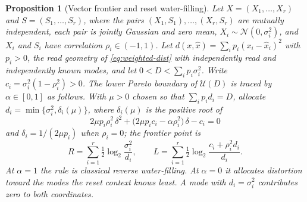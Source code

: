 \documentclass[letterpaper,onecolumn]{IEEEtran}
\newtheorem{proposition}{Proposition}
\theoremstyle{definition}
\theoremstyle{remark}
\newcommand{\1}{\mathbf{1}}
\begin{document}
\begin{proposition}[Vector frontier and reset water-filling]\label{prop:vector-frontier}
Let $X=(X_1,\ldots,X_r)$ and $S=(S_1,\ldots,S_r)$, where the pairs
$(X_1,S_1),\ldots,(X_r,S_r)$ are mutually independent, each pair is jointly
Gaussian and zero mean, $X_i\sim\mathcal N(0,\sigma_i^2)$, and $X_i$ and $S_i$
have correlation $\rho_i\in(-1,1)$. Let
$d(x,\hat x)=\sum_i p_i(x_i-\hat x_i)^2$ with $p_i>0$, the read geometry of
\eqref{eq:weighted-dist} with independently read and independently known
modes, and let $0<D<\sum_ip_i\sigma_i^2$. Write $c_i=\sigma_i^2(1-\rho_i^2)>0$.
The lower Pareto boundary of $\mathcal U(D)$ is traced by $\alpha\in[0,1]$ as
follows. With $\mu>0$ chosen so
that $\sum_i p_id_i=D$, allocate $d_i=\min\{\sigma_i^2,\delta_i(\mu)\}$,
where $\delta_i(\mu)$ is the positive root of
\begin{equation}
 2\mu p_i\rho_i^2\,\delta^2
 +\bigl(2\mu p_ic_i-\alpha\rho_i^2\bigr)\,\delta
 -c_i=0
 \label{eq:alloc-quadratic}
\end{equation}
and $\delta_i=1/(2\mu p_i)$ when $\rho_i=0$; the frontier point is
\begin{equation}
 R=\sum_{i=1}^{r}\tfrac12\log_2\frac{\sigma_i^2}{d_i},
 \qquad
 L=\sum_{i=1}^{r}\tfrac12\log_2\frac{c_i+\rho_i^2d_i}{d_i}.
 \label{eq:vector-frontier}
\end{equation}
At $\alpha=1$ the rule is classical reverse water-filling. At $\alpha=0$ it
allocates distortion toward the modes the reset context knows least. A mode
with $d_i=\sigma_i^2$ contributes zero to both coordinates.
\end{proposition}
\end{document}
